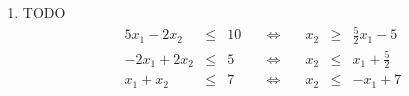 \documentclass[a4paper]{scrartcl}
\begin{document}
\begin{enumerate}
\begin{enumerate}
\begin{enumerate}[(i)]
                    \item
                        \begin{equation}
                            \begin{gathered}
                                \text{maximiere } x_1 - x_2 - x_3 + 2x_4 \\
                                \text{unter den Nebenbedingungen} \\
                                \syssubstitute{a{x_3'}b{x_3''}}
                                \sysdelim..\systeme[x_1x_2abx_4]{%
                                    -7x_1 +x_2 -4a +4b \leq  2,
                                    3x_1 -x_2 -2a +2b +x_4 \leq 3,
                                    x_2 -2x_4 \leq 7,
                                    -x_2 +2x_4 \leq -7
                                } \\
                                x_1, x_2, x_3', x_3'', x_4 \geq 0
                            \end{gathered}
                        \end{equation}
                \end{enumerate}
            \item TODO
                \begin{equation}
                    \begin{alignedat}{7}
                        5x_1 -2x_2 &\leq& 10 & \quad \Leftrightarrow & \quad x_2 &\geq& \frac{5}{2}x_1 -5 \\
                        -2x_1 +2x_2 &\leq& 5 & \quad \Leftrightarrow & \quad x_2 &\leq& x_1 +\frac{5}{2} \\
                        x_1 +x_2 &\leq& 7 & \quad \Leftrightarrow & \quad x_2 &\leq& -x_1 +7
                    \end{alignedat}
                \end{equation}
                

\end{enumerate}
\end{enumerate}
\end{document}
